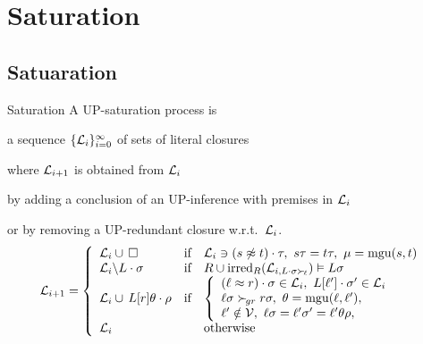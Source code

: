 \documentclass[%
handout,
]{beamer}
\begin{document}
\section{Saturation}
\subsection{Satuaration}
\begin{frame}[allowframebreaks]{Saturation}
        A UP-{saturation process} is

        a sequence \( \{ \mathcal{L}_i \}_{i=0}^\infty \)
        of sets of literal closures 
        
        where \( \mathcal{L}_{i+1} \) is obtained from \( \mathcal{L}_i \)
        
        by {adding} a conclusion of an UP-inference with premises in $\mathcal{L}_i$

        or by {removing} a UP-redundant closure w.r.t.~\(\mathcal{L}_i\).
        \begin{gather*}
            \mathcal{L}_{i+1} = \left\{
                \begin{array}{lclc}
                    \mathcal{L}_i \cup\,\square
                    &\text{if}
                    &
                        \mathcal{L}_i\ni(s\not\approx t)\cdot\tau,\ {}
                        s\tau = t\tau,\ {}
                        \mu=\operatorname{mgu}(s,t)
                    \\
                    \mathcal{L}_i \backslash L\cdot\sigma
                    &\text{if}
                    &R \cup \operatorname{irred}_R(\mathcal{L}_{i,L\cdot\sigma\mathrel\succ_{\!\ell}}) \vDash L\sigma
                    \\
                    \mathcal{L}_i \cup\, L[r]\theta\cdot\rho
                    &\text{if}
                    &\left\{\begin{array}{l}
                        (\ell\approx r)\cdot\sigma\in\mathcal{L}_i,\ {}
                        L[\ell']\cdot\sigma'\in\mathcal{L}_i
                        \\
                        \ell\sigma\mathrel\succ_{\!gr} r\sigma,\ {}
                        \theta=\operatorname{mgu}(\ell,\ell'),
                        \\
                        \ell'\notin\mathcal{V},\ {}
                        \ell\sigma = \ell'\sigma' = \ell'\theta\rho,
                    \end{array}\right.
                    \\
                    \mathcal{L}_i
                    &&\text{otherwise}
                \end{array}
            \right.
        \end{gather*}
    \newpage


\end{frame}
\end{document}
